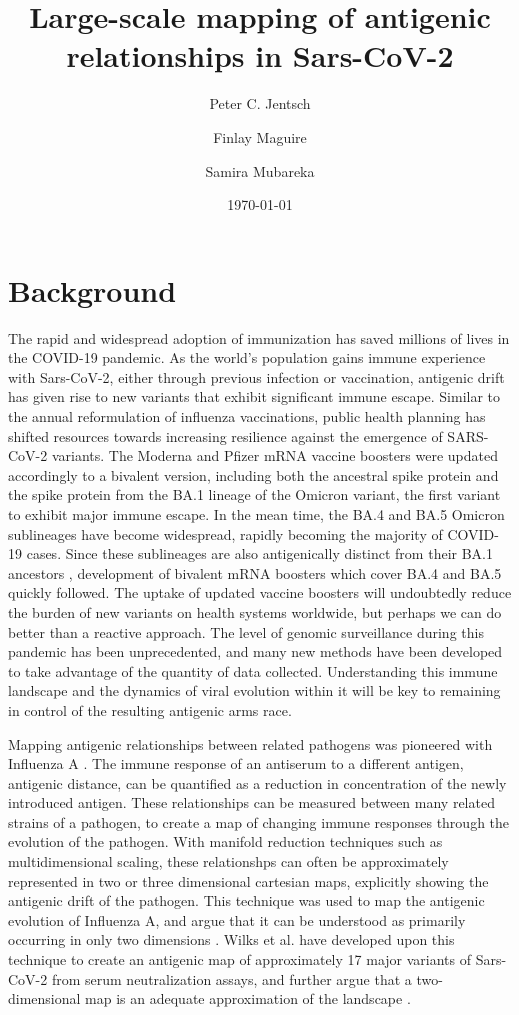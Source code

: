 \documentclass{article}
\title{Large-scale mapping of antigenic relationships in Sars-CoV-2}
\author[1,4]{Peter C. Jentsch}
\author[3,5]{Finlay Maguire}
\author[1,2]{Samira Mubareka}
\affil[1]{Sunnybrook Research Institute, Toronto, Canada}
\affil[2]{University of Toronto, Toronto, Canada}
\affil[3]{Dalhousie University, Halifax, Canada}
\affil[4]{Simon Fraser University, Burnaby, Canada}
\affil[5]{Shared Hospital Laboratory, Toronto, Canada}
\date{\today}                     %
\begin{document}
\maketitle

\section{Background}

The rapid and widespread adoption of immunization has saved millions of lives in the COVID-19 pandemic.
As the world's population gains immune experience with Sars-CoV-2, either through previous infection or vaccination, antigenic drift has given rise to new variants that exhibit significant immune escape\cite{yewdellAntigenicDriftUnderstanding2021}.
Similar to the annual reformulation of influenza vaccinations, public health planning has shifted resources towards increasing resilience against the emergence of SARS-CoV-2 variants.
The Moderna and Pfizer mRNA vaccine boosters were updated accordingly to a bivalent version, including both the ancestral spike protein and the spike protein from the BA.1 lineage of the Omicron variant, the first variant to exhibit major immune escape.
In the mean time, the BA.4 and BA.5 Omicron sublineages have become widespread, rapidly becoming the majority of COVID-19 cases. %
Since these sublineages are also antigenically distinct from their BA.1 ancestors \cite{cao2022ba}, development of bivalent mRNA boosters which cover BA.4 and BA.5 quickly followed.
The uptake of updated vaccine boosters will undoubtedly reduce the burden of new variants on health systems worldwide, but perhaps we can do better than a reactive approach.
The level of genomic surveillance during this pandemic has been unprecedented, and many new methods have been developed to take advantage of the quantity of data collected.
Understanding this immune landscape and the dynamics of viral evolution within it will be key to remaining in control of the resulting antigenic arms race.


Mapping antigenic relationships between related pathogens was pioneered with Influenza A \cite{lapedesGeometryShapeSpace2001}. 
The immune response of an antiserum to a different antigen, antigenic distance, can be quantified as a reduction in concentration of the newly introduced antigen.
These relationships can be measured between many related strains of a pathogen, to create a map of changing immune responses through the evolution of the pathogen.
With manifold reduction techniques such as multidimensional scaling, these relationshps can often be approximately represented in two or three dimensional cartesian maps, explicitly showing the antigenic drift of the pathogen.
This technique was used to map the antigenic evolution of Influenza A, and argue that it can be understood as primarily occurring in only two dimensions \cite{lapedesGeometryShapeSpace2001, smithMappingAntigenicGenetic2004}.
Wilks et al. have developed upon this technique to create an antigenic map of approximately 17 major variants of Sars-CoV-2 from serum neutralization assays, and further argue that a two-dimensional map is an adequate approximation of the landscape \cite{millerAntigenicSpaceFramework2021, wilksMappingSARSCoV2Antigenic2022, van2022mapping}. 
\end{document}
